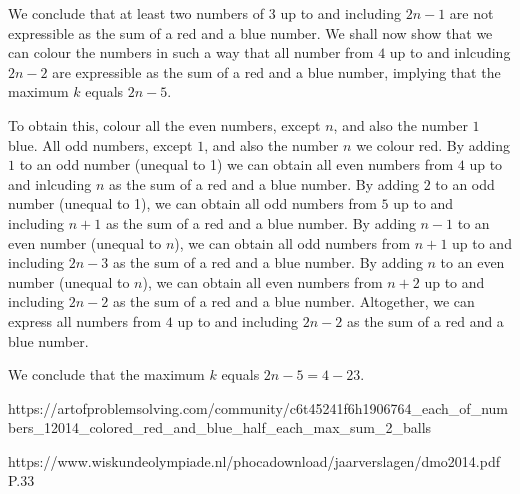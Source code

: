 \documentclass[a4paper]{article}
\begin{document}
\begin{question*}{}
{        We conclude that at least two numbers of $3$ up to and including $2n-1$ are not expressible as the sum of a red and a blue number. We shall now show that we can colour the numbers in such a way that all number from $4$ up to and inlcuding $2n-2$ are expressible as the sum of a red and a blue number, implying that the maximum $k$ equals $2n-5$.

        To obtain this, colour all the even numbers, except $n$, and also the number $1$ blue. All odd numbers, except $1$, and also the number $n$ we colour red.  By adding $1$ to an odd number (unequal to 1) we can obtain all even numbers from $4$ up to and inlcuding $n$ as the sum of a red and a blue number. By adding $2$ to an odd number (unequal to 1), we can obtain all odd numbers from $5$ up to and including $n+1$ as the sum of a red and a blue number. By adding $n-1$ to an even number (unequal to $n$), we can obtain all odd numbers from $n + 1$ up to and including $2n-3$ as the sum of a red and a blue number. By adding $n$ to an even number (unequal to $n$), we can obtain all even numbers from $n + 2$ up to and including $2n-2$ as the sum of a red and a blue number. Altogether, we can express all
        numbers from $4$ up to and including $2n-2$ as the sum of a red and a blue number.

        We conclude that the maximum $k$ equals $2n-5=4-23$.
        }{%
        https://artofproblemsolving.com/community/c6t45241f6h1906764_each_of_numbers_12014_colored_red_and_blue_half_each_max_sum_2_balls

        https://www.wiskundeolympiade.nl/phocadownload/jaarverslagen/dmo2014.pdf
        P.33
    }

\end{question*}
\end{document}

